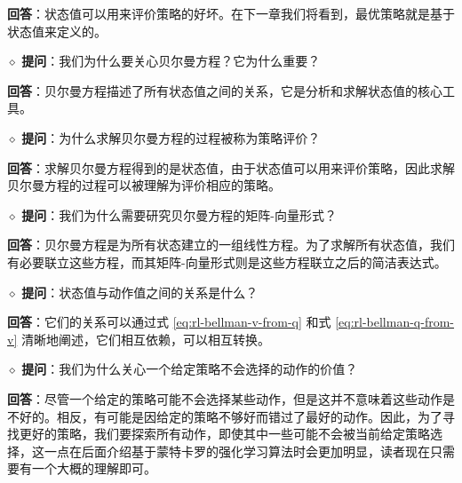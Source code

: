\textbf{回答}：状态值可以用来评价策略的好坏。在下一章我们将看到，最优策略就是基于状态值来定义的。

\medskip
$\diamond$ \textbf{提问}：我们为什么要关心贝尔曼方程？它为什么重要？

\textbf{回答}：贝尔曼方程描述了所有状态值之间的关系，它是分析和求解状态值的核心工具。

\medskip
$\diamond$ \textbf{提问}：为什么求解贝尔曼方程的过程被称为策略评价？

\textbf{回答}：求解贝尔曼方程得到的是状态值，由于状态值可以用来评价策略，因此求解贝尔曼方程的过程可以被理解为评价相应的策略。

\medskip
$\diamond$ \textbf{提问}：我们为什么需要研究贝尔曼方程的矩阵-向量形式？

\textbf{回答}：贝尔曼方程是为所有状态建立的一组线性方程。为了求解所有状态值，我们有必要联立这些方程，而其矩阵-向量形式则是这些方程联立之后的简洁表达式。

\medskip
$\diamond$ \textbf{提问}：状态值与动作值之间的关系是什么？

\textbf{回答}：它们的关系可以通过式 \cref{eq:rl-bellman-v-from-q} 和式 \cref{eq:rl-bellman-q-from-v} 清晰地阐述，它们相互依赖，可以相互转换。

\medskip
$\diamond$ \textbf{提问}：我们为什么关心一个给定策略不会选择的动作的价值？

\textbf{回答}：尽管一个给定的策略可能不会选择某些动作，但是这并不意味着这些动作是不好的。相反，有可能是因给定的策略不够好而错过了最好的动作。因此，为了寻找更好的策略，我们要探索所有动作，即使其中一些可能不会被当前给定策略选择，这一点在后面介绍基于蒙特卡罗的强化学习算法时会更加明显，读者现在只需要有一个大概的理解即可。
